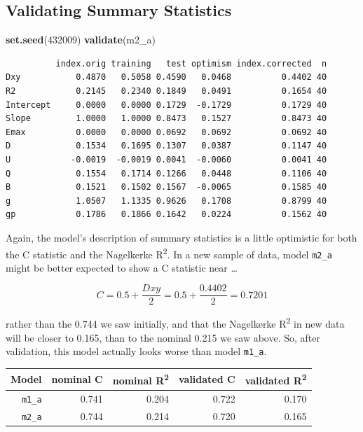 \documentclass[]{book}
\newenvironment{Shaded}{\begin{snugshade}}{\end{snugshade}}
\newcommand{\KeywordTok}[1]{\textcolor[rgb]{0.13,0.29,0.53}{\textbf{#1}}}
\newcommand{\DecValTok}[1]{\textcolor[rgb]{0.00,0.00,0.81}{#1}}
\newcommand{\NormalTok}[1]{#1}
\theoremstyle{definition}
\theoremstyle{definition}
\theoremstyle{definition}
\theoremstyle{remark}
\begin{document}
\subsection{Validating Summary
Statistics}\label{validating-summary-statistics-1}

\begin{Shaded}
\begin{Highlighting}[]
\KeywordTok{set.seed}\NormalTok{(}\DecValTok{432009}\NormalTok{)}
\KeywordTok{validate}\NormalTok{(m2_a)}
\end{Highlighting}
\end{Shaded}

\begin{verbatim}
          index.orig training   test optimism index.corrected  n
Dxy           0.4870   0.5058 0.4590   0.0468          0.4402 40
R2            0.2145   0.2340 0.1849   0.0491          0.1654 40
Intercept     0.0000   0.0000 0.1729  -0.1729          0.1729 40
Slope         1.0000   1.0000 0.8473   0.1527          0.8473 40
Emax          0.0000   0.0000 0.0692   0.0692          0.0692 40
D             0.1534   0.1695 0.1307   0.0387          0.1147 40
U            -0.0019  -0.0019 0.0041  -0.0060          0.0041 40
Q             0.1554   0.1714 0.1266   0.0448          0.1106 40
B             0.1521   0.1502 0.1567  -0.0065          0.1585 40
g             1.0507   1.1335 0.9626   0.1708          0.8799 40
gp            0.1786   0.1866 0.1642   0.0224          0.1562 40
\end{verbatim}

Again, the model's description of summary statistics is a little
optimistic for both the C statistic and the Nagelkerke
R\textsuperscript{2}. In a new sample of data, model \texttt{m2\_a}
might be better expected to show a C statistic near \ldots{}

\[ 
C = 0.5 + \frac{Dxy}{2} = 0.5 + \frac{0.4402}{2} = 0.7201
\]

rather than the 0.744 we saw initially, and that the Nagelkerke
R\textsuperscript{2} in new data will be closer to 0.165, than to the
nominal 0.215 we saw above. So, after validation, this model actually
looks worse than model \texttt{m1\_a}.

\begin{longtable}[]{@{}rrrrr@{}}
\toprule
Model & nominal C & nominal R\textsuperscript{2} & validated C &
validated R\textsuperscript{2}\tabularnewline
\midrule
\endhead
\texttt{m1\_a} & 0.741 & 0.204 & 0.722 & 0.170\tabularnewline
\texttt{m2\_a} & 0.744 & 0.214 & 0.720 & 0.165\tabularnewline
\bottomrule
\end{longtable}
\end{document}
